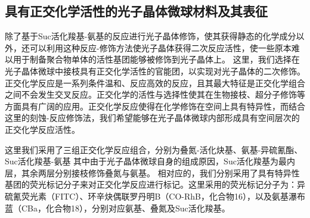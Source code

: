 \subsection{具有正交化学活性的光子晶体微球材料及其表征}

除了基于Suc活化羧基-氨基的反应进行光子晶体修饰，使其获得静态的化学成分以外，还可以利用这种反应-修饰方法使光子晶体获得二次反应活性，使一些原本难以用于制备聚合物单体的活性基团能够被修饰到光子晶体上。
这里，我们选择在光子晶体微球中接枝具有正交化学活性的官能团，以实现对光子晶体的二次修饰。
正交化学反应是一系列条件温和、反应高效的反应，且其最大特征是正交化学组合之间不会发生交叉反应。正交化学的活性与选择性使其在生物接枝、超分子修饰等方面具有广阔的应用\cite{Agard2006Comparative,Elacqua2014Engineering}。正交化学反应使得在化学修饰在空间上具有特异性，而结合这里的刻蚀-反应修饰法，我们希望能够在光子晶体微球内部形成具有空间层次的正交化学反应活性。

这里我们采用了三组正交化学反应组合，分别为叠氮-活化炔基、氨基-异硫氰酯、Suc活化羧基-氨基
其中由于光子晶体微球自身的组成原因，Suc活化羧基为最内层，其余两层分别接枝修饰叠氮与氨基。
相对应的，我们分别采用了具有特异性基团的荧光标记分子来对正交化学反应进行标记。这里采用的荧光标记分子为：异硫氰荧光素（FITC）、环辛炔偶联罗丹明B（CO-RhB，化合物16），以及氨基瀑布蓝（CBa，化合物18），分别对应氨基、叠氮及Suc活化羧基。

